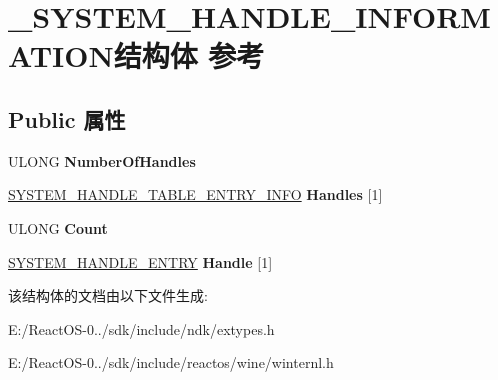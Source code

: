 \hypertarget{struct___s_y_s_t_e_m___h_a_n_d_l_e___i_n_f_o_r_m_a_t_i_o_n}{}\section{\+\_\+\+S\+Y\+S\+T\+E\+M\+\_\+\+H\+A\+N\+D\+L\+E\+\_\+\+I\+N\+F\+O\+R\+M\+A\+T\+I\+O\+N结构体 参考}
\label{struct___s_y_s_t_e_m___h_a_n_d_l_e___i_n_f_o_r_m_a_t_i_o_n}
\subsection*{Public 属性}
\begin{DoxyCompactItemize}
\item 
\mbox{\label{struct___s_y_s_t_e_m___h_a_n_d_l_e___i_n_f_o_r_m_a_t_i_o_n_a0723dddea4a4b3a693c414cf636b836f}} 
U\+L\+O\+NG {\bfseries Number\+Of\+Handles}
\item 
\mbox{\label{struct___s_y_s_t_e_m___h_a_n_d_l_e___i_n_f_o_r_m_a_t_i_o_n_ac6ed17193c24474549c5fd1d3293b7c2}} 
\hyperlink{struct___s_y_s_t_e_m___h_a_n_d_l_e___t_a_b_l_e___e_n_t_r_y___i_n_f_o}{S\+Y\+S\+T\+E\+M\+\_\+\+H\+A\+N\+D\+L\+E\+\_\+\+T\+A\+B\+L\+E\+\_\+\+E\+N\+T\+R\+Y\+\_\+\+I\+N\+FO} {\bfseries Handles} \mbox{[}1\mbox{]}
\item 
\mbox{\label{struct___s_y_s_t_e_m___h_a_n_d_l_e___i_n_f_o_r_m_a_t_i_o_n_a427bf878cfcc37586a75e2e07296e130}} 
U\+L\+O\+NG {\bfseries Count}
\item 
\mbox{\label{struct___s_y_s_t_e_m___h_a_n_d_l_e___i_n_f_o_r_m_a_t_i_o_n_aff84dd9fbe102f16c7463a52cc0cff77}} 
\hyperlink{struct___s_y_s_t_e_m___h_a_n_d_l_e___e_n_t_r_y}{S\+Y\+S\+T\+E\+M\+\_\+\+H\+A\+N\+D\+L\+E\+\_\+\+E\+N\+T\+RY} {\bfseries Handle} \mbox{[}1\mbox{]}
\end{DoxyCompactItemize}


该结构体的文档由以下文件生成\+:\begin{DoxyCompactItemize}
\item 
E\+:/\+React\+O\+S-\/0../sdk/include/ndk/extypes.\+h\item 
E\+:/\+React\+O\+S-\/0../sdk/include/reactos/wine/winternl.\+h\end{DoxyCompactItemize}
